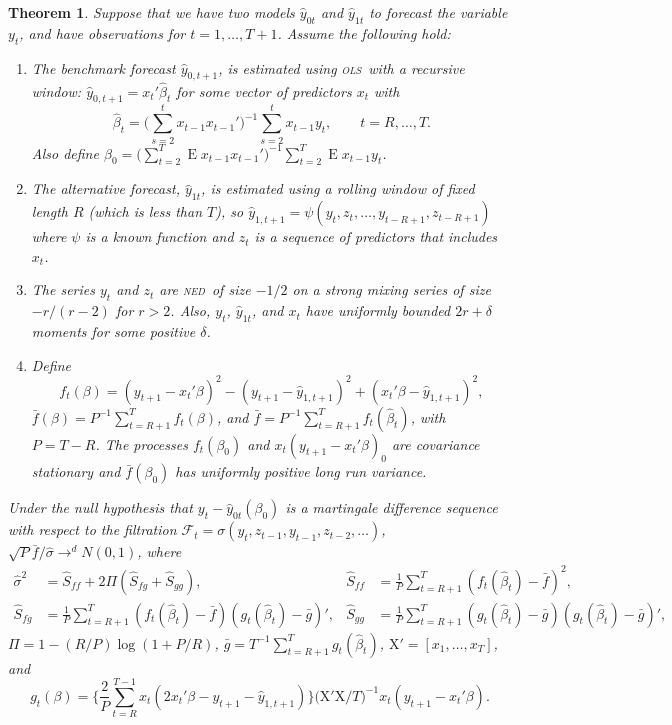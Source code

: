 \documentclass[12pt]{article}
\newtheorem{thm}{Theorem}
\theoremstyle{definition}
\DeclareMathOperator{\E}{E}
\newcommand{\X}{\ensuremath{\mathrm{X}}}
\newcommand{\ned}{\textsc{ned}}
\newcommand{\ols}{\textsc{ols}}
\begin{document}
\begin{thm}\label{res:1}
  Suppose that we have two models $\hat{y}_{0t}$ and $\hat{y}_{1t}$ to
  forecast the variable $y_t$, and have observations for
  $t=1,\dots,T+1$.  Assume the following hold:
  \begin{enumerate}
  \item \label{item:1} The benchmark forecast $\hat{y}_{0,t+1}$, is
    estimated using \ols\ with a recursive window: $\hat{y}_{0,t+1} =
    x_t'\hat{\beta}_t$ for some vector of predictors $x_t$ with
    \begin{equation}
      \hat{\beta}_t = \Big(\sum_{s=2}^{t} x_{t-1} x_{t-1}'\Big)^{-1}
      \sum_{s=2}^t x_{t-1} y_t, \qquad t = R,\dots,T.
    \end{equation}
    Also define $\beta_0 = \big(\sum_{t=2}^{T} \E x_{t-1}
    x_{t-1}'\big)^{-1} \sum_{t=2}^T \E x_{t-1} y_t$.
  \item \label{item:2} The alternative forecast, $\hat{y}_{1t}$, is
    estimated using a rolling window of fixed length $R$ (which is
    less than $T$), so $\hat{y}_{1,t+1} =
    \psi(y_t,z_t,\dots,y_{t-R+1}, z_{t-R+1})$ where $\psi$ is a known
    function and $z_t$ is a sequence of predictors that includes
    $x_t$.
  \item \label{item:3} The series $y_t$ and $z_t$ are \ned\ of size
    $-1/2$ on a strong mixing series of size $-r/(r-2)$ for $r>2$.
    Also, $y_t$, $\hat{y}_{1t}$, and $x_t$ have uniformly bounded $2
    r+\delta$ moments for some positive $\delta$.
  \item \label{item:4} Define \[f_t(\beta) = (y_{t+1} - x_t'\beta)^2 -
    (y_{t+1} - \hat{y}_{1,t+1})^2 + (x_t'\beta - \hat{y}_{1,t+1})^2,\]
    $\bar{f}(\beta) = P^{-1} \sum_{t=R+1}^T f_t(\beta)$, and $\bar f =
    P^{-1} \sum_{t=R+1}^{T} f_t(\hat{\beta}_t)$, with $P = T - R$. The
    processes $f_t(\beta_0)$ and $x_t(y_{t+1} - x_t'\beta)_0$ are
    covariance stationary and $\bar f(\beta_0)$ has uniformly positive
    long run variance.
  \end{enumerate}
  Under the null hypothesis that $y_t - \hat{y}_{0t}(\beta_0)$ is a
  martingale difference sequence with respect to the filtration
  $\mathcal{F}_t = \sigma(y_t, z_{t-1}, y_{t-1}, z_{t-2},\dots)$, $\sqrt{P} \bar f /
  \hat{\sigma} \to^d N(0,1)$, where
  \begin{align*}
    \hat{\sigma}^2 &= \hat{S}_{ff} + 2 \Pi (\hat{S}_{fg} + \hat{S}_{gg}), &
    \hat{S}_{ff} &= \frac1P \sum_{t=R+1}^T (f_t(\hat{\beta}_t) - \bar
    f)^2, \\
    \hat{S}_{fg} &= \frac1P \sum_{t=R+1}^T (f_t(\hat{\beta}_t) -
    \bar{f})(g_t(\hat{\beta}_t) - \bar g)', &
    \hat{S}_{gg} &= \frac1P \sum_{t=R+1}^T (g_t(\hat{\beta}_t) - \bar
    g)(g_t(\hat{\beta}_t) - \bar g)',
  \end{align*}
  $\Pi = 1 - (R/P) \log(1 + P/R)$, $\bar{g} = T^{-1}
  \sum_{t=R+1}^T g_t(\hat{\beta}_t)$, $\X' = [x_1,\dots,x_T]$, and
  \begin{equation*}
  g_t(\beta) = \Bigg\{\frac{2}{P}\sum_{t=R}^{T-1} x_t (2 x_t'\beta -
    y_{t+1} - \hat{y}_{1,t+1}) \Bigg\} \big(\X'\X / T \big)^{-1}  x_t(y_{t+1} - x_t'\beta).
  \end{equation*}
\end{thm}
\end{document}
